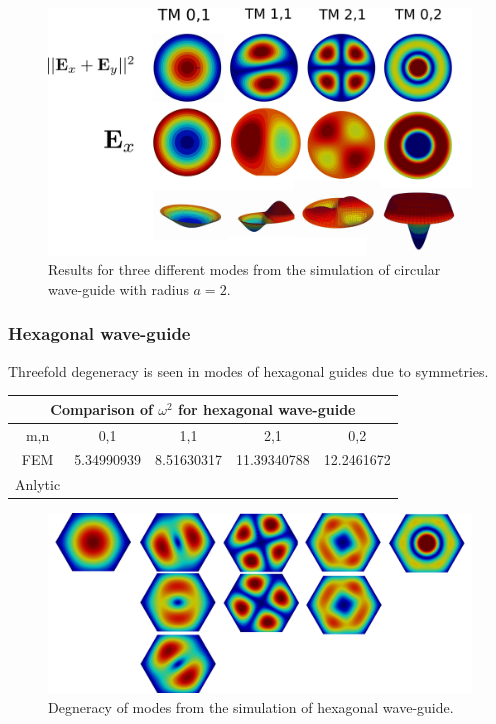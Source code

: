 \begin{figure}
\centering
\includegraphics[scale=0.1]{./img/circular_waveguide.pdf}
\caption{Results for three different modes from the simulation of circular wave-guide with radius $a=2$.}
\label{fig:circular_waveguide}
\end{figure}

\subsubsection{Hexagonal wave-guide}

Threefold degeneracy is seen in modes of hexagonal guides due to symmetries.

\begin{center}
\begin{tabular}{|c|c|c|c|c|}
\hline
\multicolumn{5}{|c|}{Comparison of $\omega^2$ for hexagonal wave-guide} \\
\hline 
m,n & 0,1 & 1,1 & 2,1 & 0,2 \\ 
\hline 
FEM     & 5.34990939 & 8.51630317 & 11.39340788 & 12.2461672 \\ 
\hline 
Anlytic &  &  &  &  \\ 
\hline 
\end{tabular} 
\label{tab:hex_wav_comparison}
\end{center}

\begin{figure}
\centering
\includegraphics[scale=0.07]{./img/hexagonal_waveguide.pdf}
\caption{Degneracy of modes from the simulation of hexagonal wave-guide.}
\label{fig:hexagonal_waveguide}
\end{figure}
